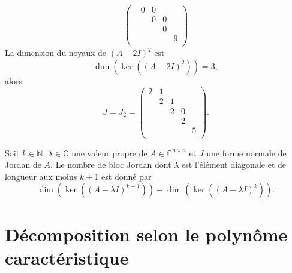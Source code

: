 \begin{example}
\begin{displaymath}
\begin{pmatrix}
    & 0 & 0 \\
    & & 0 & 0 \\
    & & & 0   \\
    & & & & 9 \\
  \end{pmatrix}
\end{displaymath}
La dimension du noyaux  de $(A - 2I)^2$  est
\begin{displaymath}
\dim(  \ker((A - 2I)^2) ) = 3,
\end{displaymath}
alors
\begin{displaymath}
  J = J_2 =  \begin{pmatrix}
    2 & 1  \\
    & 2 & 1 \\
    & & 2 & 0 \\
    & & & 2   \\
    & & & & 5 \\
  \end{pmatrix}. 
\end{displaymath}
\end{example}


\begin{lemma}
  \label{lem:30}
  Soit $k ∈ ℕ$, $λ∈ ℂ$ une valeur propre de $A ∈ℂ^{n×n}$ et $J$ une forme normale de Jordan de $A$.   Le nombre de bloc Jordan dont $λ$ est l'élément diagonale et de longueur aux moins $k+1$   est donné par
  \begin{displaymath}
    \dim(\ker\left((A - λI)^{k+1}\right)) -\dim(\ker\left((A - λI)^{k}\right)). 
  \end{displaymath}
\end{lemma}






\section{Décomposition selon le polynôme caractéristique}
\label{sec:decomp-selon-le}




